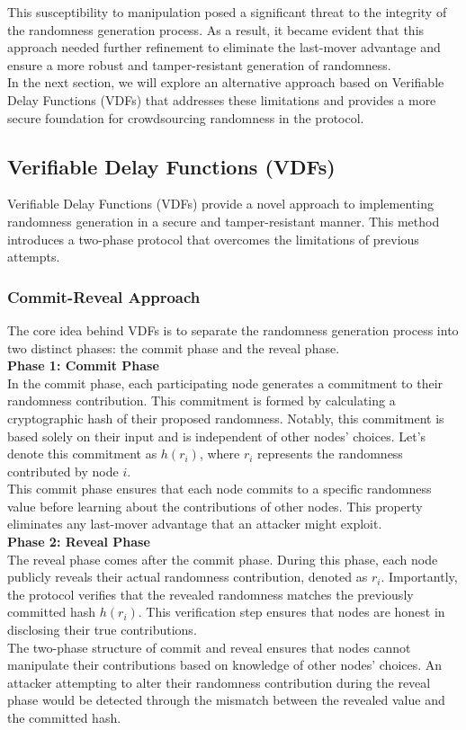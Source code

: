 This susceptibility to manipulation posed a significant threat to the integrity of the randomness generation process. As a result, it became evident that this approach needed further refinement to eliminate the last-mover advantage and ensure a more robust and tamper-resistant generation of randomness.\\
In the next section, we will explore an alternative approach based on Verifiable Delay Functions (VDFs) that addresses these limitations and provides a more secure foundation for crowdsourcing randomness in the protocol.
\subsection{Verifiable Delay Functions (VDFs)}
Verifiable Delay Functions (VDFs) provide a novel approach to implementing randomness generation in a secure and tamper-resistant manner. This method introduces a two-phase protocol that overcomes the limitations of previous attempts.

\subsubsection{Commit-Reveal Approach}
The core idea behind VDFs is to separate the randomness generation process into two distinct phases: the commit phase and the reveal phase.\\

\noindent
\textbf{Phase 1: Commit Phase}\\
In the commit phase, each participating node generates a commitment to their randomness contribution. This commitment is formed by calculating a cryptographic hash of their proposed randomness. Notably, this commitment is based solely on their input and is independent of other nodes' choices. Let's denote this commitment as $h(r_i)$, where $r_i$ represents the randomness contributed by node $i$.\\
This commit phase ensures that each node commits to a specific randomness value before learning about the contributions of other nodes. This property eliminates any last-mover advantage that an attacker might exploit.\\

\noindent
\textbf{Phase 2: Reveal Phase}\\
The reveal phase comes after the commit phase. During this phase, each node publicly reveals their actual randomness contribution, denoted as $r_i$. Importantly, the protocol verifies that the revealed randomness matches the previously committed hash $h(r_i)$. This verification step ensures that nodes are honest in disclosing their true contributions.\\
The two-phase structure of commit and reveal ensures that nodes cannot manipulate their contributions based on knowledge of other nodes' choices. An attacker attempting to alter their randomness contribution during the reveal phase would be detected through the mismatch between the revealed value and the committed hash.

